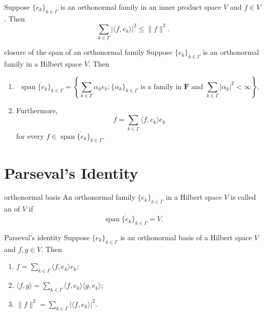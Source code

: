 \documentclass[../main.tex]{subfiles}
\begin{document}
\begin{theorem}{}{}
Suppose $\{e_k\}_{k\in\Gamma}$ is an orthonormal family in an inner product space $V$ and $f \in V$.
Then
\[
\sum_{k\in\Gamma} |\langle f, e_k \rangle|^2 \leq \|f\|^2.
\]
\end{theorem}


\begin{theorem}{closure of the span of an orthonormal family}{}
Suppose $\{e_k\}_{k\in\Gamma}$ is an orthonormal family in a Hilbert space $V$. Then


\begin{enumerate}

\item[(a)] 
\[ \overline{\operatorname{span}\{e_k\}_{k\in\Gamma}} = \left\{ \sum_{k\in\Gamma} \alpha_k e_k : \{\alpha_k\}_{k\in\Gamma} \text{ is a family in } \mathbf{F} \text{ and } \sum_{k\in\Gamma} |\alpha_k|^2 < \infty \right\}. \]

\item[(b)] Furthermore,\[ f = \sum_{k\in\Gamma} \langle f, e_k\rangle e_k \]
for every $f \in \overline{\operatorname{span}\{e_k\}_{k\in\Gamma}}$.
\end{enumerate}

\end{theorem}

\section{Parseval's Identity}

\begin{definition}{orthonormal basis}{}
An orthonormal family $\{e_k\}_{k\in\Gamma}$ in a Hilbert space $V$ is called an  of $V$ if
\[
\overline{\operatorname{span}\{e_k\}_{k\in\Gamma}} = V.
\]
\end{definition}

\begin{theorem}{Parseval's identity}{}
Suppose $\{e_k\}_{k\in\Gamma}$ is an orthonormal basis of a Hilbert space $V$ and $f,g \in V$. Then
\begin{enumerate}
\item $\displaystyle f = \sum_{k\in\Gamma} \langle f,e_k\rangle e_k$;
\item $\displaystyle \langle f,g\rangle = \sum_{k\in\Gamma} \langle f,e_k\rangle \overline{\langle g,e_k\rangle}$;
\item $\displaystyle \|f\|^2 = \sum_{k\in\Gamma} |\langle f,e_k\rangle|^2$.
\end{enumerate}
\end{theorem}
\end{document}
